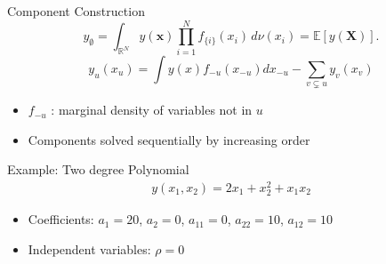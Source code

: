 \begin{frame}{Component Construction} %
    \[
    y_{\emptyset} = \int_{\mathbb{R}^N} y(\boldsymbol{x}) \prod_{i=1}^{N} f_{\{i\}}(x_i) \, d\nu (x_i) = \mathbb{E}[y(\boldsymbol{X})].
    \]
    \[
      y_u(x_u) =
        \int y(x) f_{-u}(x_{-u}) dx_{-u}
        - \sum_{v \subsetneq u} y_v(x_v)
    \]
  \begin{itemize}
    \item $f_{-u}$ : marginal density of variables not in $u$
    \item Components solved sequentially by increasing order
  \end{itemize}
\end{frame}


\begin{frame}{Example: Two degree Polynomial} %
  \begin{align}
    y(x_1, x_2) = 2x_1 + x_2^{2} + x_1 x_2
  \end{align}
  \begin{itemize}
    \item Coefficients: $a_1 = 20$, $a_2 = 0$, $a_{11} = 0$, $a_{22} = 10$, $a_{12} = 10$
    \item Independent variables: $\rho = 0$
  \end{itemize}  
\end{frame}


